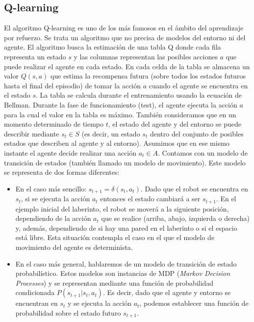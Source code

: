 \documentclass{article}
\begin{document}
\subsection{Q-learning}
El algoritmo Q-learning es uno de los más famosos en el ámbito del aprendizaje por refuerzo. Se trata un algoritmo que no precisa de modelos del entorno ni del agente. El algoritmo busca la estimación de una tabla Q donde cada fila representa un estado $s$ y las columnas representan las posibles acciones $a$ que puede realizar el agente en cada estado. En cada celda de la tabla se almacena un valor $Q(s, a)$ que estima la recompensa futura (sobre todos los estados futuros hasta el final del episodio) de tomar la acción $a$ cuando el agente se encuentra en el estado $s$. La tabla se calcula durante el entrenamiento usando la ecuación de Bellman. Durante la fase de funcionamiento (test), el agente ejecuta la acción $a$ para la cual el valor en la tabla es máximo.
También consideramos que en un momento determinado de tiempo $t$, el estado del agente y del entorno se puede describir mediante $s_t \in S$ (es decir, un estado $s_t$ dentro del conjunto de posibles estados que describen al agente y al entorno). Asumimos que en ese mismo instante el agente decide realizar una acción $a_t \in A$. Contamos con un modelo de transición de estados (también llamado un modelo de movimiento). Este modelo se representa de dos formas diferentes:
\begin{itemize}
    \item En el caso más sencillo: $s_{t+1}=\delta(s_t, a_t)$. Dado que el robot se encuentra en $s_t$, si se ejecuta la acción $a_t$ entonces el estado cambiará a ser $s_{t+1}$. En el ejemplo inicial del laberinto, el robot se moverá a la siguiente posición, dependiendo de la acción $a_t$ que se realice (arriba, abajo, izquierda o derecha) y, además, dependiendo de si hay una pared en el laberinto o si el espacio está libre. Esta situación contempla el caso en el que el modelo de movimiento del agente es determinista.
    \item En el caso más general, hablaremos de un modelo de transición de estado probabilístico. Estos modelos son instancias de MDP (\emph{Markov Decision Processes}) y se representan mediante una función de probabilidad condicionada
    $P(s_{t+1}|s_t, a_t)$. Es decir, dado que el agente y entorno se encuentran en $s_t$ y se ejecuta la acción $a_t$, podemos establecer una función de probabilidad sobre el estado futuro $s_{t+1}$.
\end{itemize} 
\end{document}
